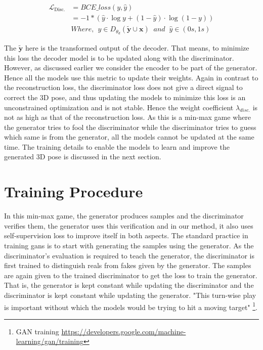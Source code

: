 \begin{equation} \label{eqn:loss_bce}
    \begin{split}
        \mathcal{L}_{\text {Disc.}} & = BCE\_loss(y, \hat{y}) \\
        & = -1 * (\hat{y} \cdot \log y + (1 - \hat{y}) \cdot \log (1 - y)) \\
        & Where, \:\: y \in D_{\theta_d}(\tilde{\textbf{y}} \cup \textbf{x}) \;\; and \;\; \hat{y} \in (0s, 1s)
    \end{split}
\end{equation}

The $\tilde{\textbf{y}}$ here is the transformed output of the decoder. That means, to minimize this loss the decoder model is to be updated along with the discriminator. However, as discussed earlier we consider the encoder to be part of the generator. Hence all the models use this metric to update their weights. Again in contrast to the reconstruction loss, the discriminator loss does not give a direct signal to correct the 3D pose, and thus updating the models to minimize this loss is an unconstrained optimization and is not stable. Hence the weight coefficient $\lambda_{disc.}$ is not as high as that of the reconstruction loss. As this is a min-max game where the generator tries to fool the discriminator while the discriminator tries to guess which same is from the generator, all the models cannot be updated at the same time. The training details to enable the models to learn and improve the generated 3D pose is discussed in the next section.

\section{Training Procedure}
In this min-max game, the generator produces samples and the discriminator verifies them, the generator uses this verification and in our method, it also uses self-supervision loss to improve itself in both aspects. The standard practice in training \acp{gan} is to start with generating the samples using the generator. As the discriminator's evaluation is required to teach the generator, the discriminator is first trained to distinguish reals from fakes given by the generator. The samples are again given to the trained discriminator to get the loss to train the generator. That is, the generator is kept constant while updating the discriminator and the discriminator is kept constant while updating the generator. "This turn-wise play is important without which the models would be trying to hit a moving target" \footnote{GAN training \url{https://developers.google.com/machine-learning/gan/training}}.


